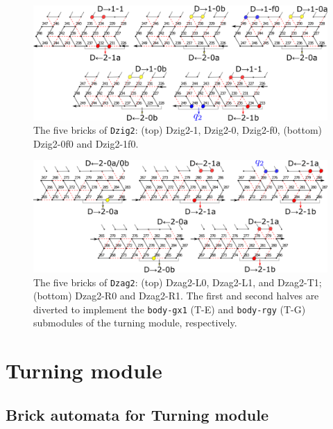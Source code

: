 \documentclass[dvipdfmx,review]{elsarticle}
\begin{document}
\begin{figure}[h]
\centering
\includegraphics[width=\linewidth]{Figs/DFAO-zig2.png}
\caption{The five bricks of \texttt{Dzig2}: (top) Dzig2-1, Dzig2-0, Dzig2-f0, (bottom) Dzig2-0f0 and Dzig2-1f0. }
\label{fig:Dzig2}
\end{figure}

\begin{figure}[h]
\centering
\includegraphics[width=\linewidth]{Figs/DFAO-zag2.png}  
\caption{The five bricks of \texttt{Dzag2}: (top) Dzag2-L0, Dzag2-L1, and Dzag2-T1; (bottom) Dzag2-R0 and Dzag2-R1. 
The first and second halves are diverted to implement the \texttt{body-gx1} (T-E) and \texttt{body-rgy} (T-G) submodules of the turning module, respectively.}
\label{fig:Dzag2}
\end{figure}

\clearpage

	\section{Turning module}
	\label{ap_sect:Turner_module}

	\subsection{Brick automata for Turning module}
	\label{ap_subsect:Turner_module_BA}
\end{document}

